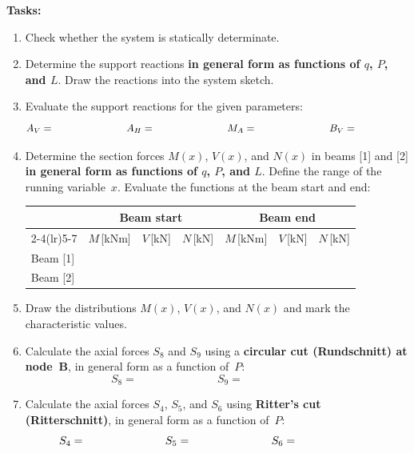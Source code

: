 \documentclass[a4paper,11pt]{article}
\begin{document}
\textbf{Tasks:}
\begin{enumerate}[leftmargin=*, label=\arabic*.]
  \item Check whether the system is statically determinate.
  \item Determine the support reactions \textbf{in general form as functions of $q$, $P$, and $L$}.
        Draw the reactions into the system sketch.
  \item Evaluate the support reactions for the given parameters:
        \[
          A_V = \hspace{2.5cm}
          A_H = \hspace{2.5cm}
          M_A = \hspace{2.5cm}
          B_V = \hspace{2.5cm}
        \]
  \item Determine the section forces $M(x)$, $V(x)$, and $N(x)$ in beams [1] and [2]
        \textbf{in general form as functions of $q$, $P$, and $L$}.
        Define the range of the running variable~$x$.
        Evaluate the functions at the beam start and end:

        \medskip
        \begin{tabular}{l cccccc}
        \toprule
         & \multicolumn{3}{c}{\textbf{Beam start}} & \multicolumn{3}{c}{\textbf{Beam end}} \\
        \cmidrule(lr){2-4}\cmidrule(lr){5-7}
         & $M$\,[kNm] & $V$\,[kN] & $N$\,[kN]
         & $M$\,[kNm] & $V$\,[kN] & $N$\,[kN] \\
        \midrule
        Beam [1] & & & & & & \\[6pt]
        Beam [2] & & & & & & \\
        \bottomrule
        \end{tabular}

  \item Draw the distributions $M(x)$, $V(x)$, and $N(x)$ and mark the characteristic values.

  \item Calculate the axial forces $S_8$ and $S_9$ using a \textbf{circular cut (Rundschnitt)
        at node~B}, in general form as a function of~$P$:
        \[
          S_8 = \hspace{3cm} S_9 = \hspace{3cm}
        \]

  \item Calculate the axial forces $S_4$, $S_5$, and $S_6$ using \textbf{Ritter's cut
        (Ritterschnitt)}, in general form as a function of~$P$:
        \[
          S_4 = \hspace{2.5cm} S_5 = \hspace{2.5cm} S_6 = \hspace{2.5cm}
        \]
\end{enumerate}
\end{document}
